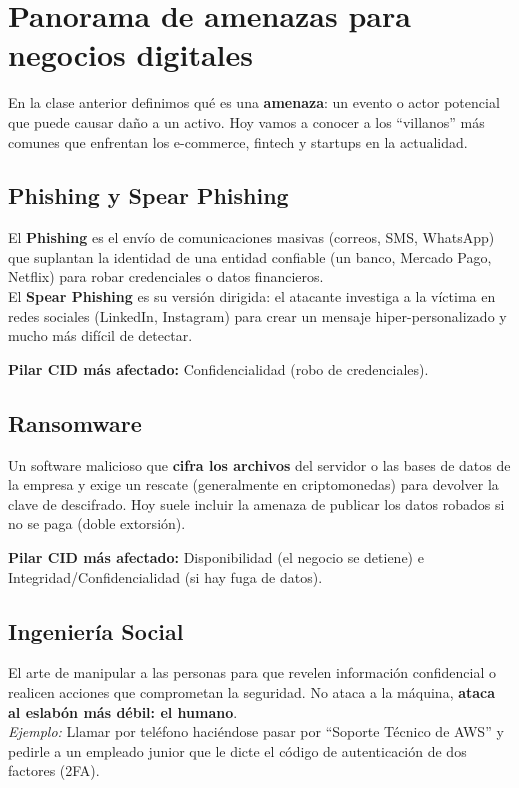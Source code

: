 \documentclass[12pt,a4paper]{article}
\begin{document}
\section{Panorama de amenazas para negocios digitales}

En la clase anterior definimos qu\'e es una \textbf{amenaza}: un evento o actor potencial que puede causar da\~no a un activo. Hoy vamos a conocer a los ``villanos'' m\'as comunes que enfrentan los e-commerce, fintech y startups en la actualidad.

\subsection{Phishing y Spear Phishing}
\begin{cajaAmenaza}
El \textbf{Phishing} es el env\'io de comunicaciones masivas (correos, SMS, WhatsApp) que suplantan la identidad de una entidad confiable (un banco, Mercado Pago, Netflix) para robar credenciales o datos financieros.\\[4pt]
El \textbf{Spear Phishing} es su versi\'on dirigida: el atacante investiga a la v\'ictima en redes sociales (LinkedIn, Instagram) para crear un mensaje hiper-personalizado y mucho m\'as dif\'icil de detectar.
\end{cajaAmenaza}

\textbf{Pilar CID m\'as afectado:} Confidencialidad (robo de credenciales).

\subsection{Ransomware}
\begin{cajaAmenaza}
Un software malicioso que \textbf{cifra los archivos} del servidor o las bases de datos de la empresa y exige un rescate (generalmente en criptomonedas) para devolver la clave de descifrado. Hoy suele incluir la amenaza de publicar los datos robados si no se paga (doble extorsi\'on).
\end{cajaAmenaza}

\textbf{Pilar CID m\'as afectado:} Disponibilidad (el negocio se detiene) e Integridad/Confidencialidad (si hay fuga de datos).

\subsection{Ingenier\'ia Social}
\begin{cajaAmenaza}
El arte de manipular a las personas para que revelen informaci\'on confidencial o realicen acciones que comprometan la seguridad. No ataca a la m\'aquina, \textbf{ataca al eslab\'on m\'as d\'ebil: el humano}.\\[4pt]
\emph{Ejemplo:} Llamar por tel\'efono haci\'endose pasar por ``Soporte T\'ecnico de AWS'' y pedirle a un empleado junior que le dicte el c\'odigo de autenticaci\'on de dos factores (2FA).
\end{cajaAmenaza}
\end{document}
